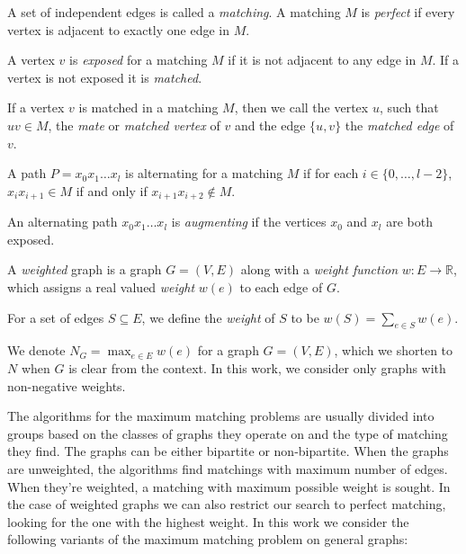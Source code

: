 \begin{defn}[matching]
    A set of independent edges is called a \emph{matching}. A matching $M$ is \emph{perfect} if every vertex is adjacent to exactly one edge in $M$.
\end{defn}

\begin{defn}
    A vertex $v$ is \emph{exposed} for a matching $M$ if it is not adjacent to any edge in $M$. If a vertex is not exposed it is \emph{matched}.
\end{defn}

If a vertex $v$ is matched in a matching $M$, then we call the vertex $u$, such that $uv \in M$, the \emph{mate} or \emph{matched vertex} of $v$ and the edge $\{u, v\}$ the \emph{matched edge} of $v$.

\begin{defn}
    A path $P = x_0x_1\dots x_l$ is alternating for a matching $M$ if for each $i \in \{0, \dots, l - 2\}$, $x_i x_{i+1} \in M$ if and only if $x_{i+1}x_{i+2} \notin M$.
\end{defn}

\begin{defn}
    An alternating path $x_0x_1\dots x_l$ is \emph{augmenting} if the vertices $x_0$ and $x_l$ are both exposed.
\end{defn}

\begin{defn}
    A \emph{weighted} graph is a graph $G = (V, E)$ along with a \emph{weight function} $w : E \rightarrow \mathbb{R}$, which assigns a real valued \emph{weight} $w(e)$ to each edge of $G$.
\end{defn}

For a set of edges $S \subseteq E$, we define the \emph{weight} of $S$ to be $w(S) = \sum_{e \in S} w(e)$. 

We denote $N_G = \max_{e \in E} w(e)$ for a graph $G = (V, E)$, which we shorten to $N$ when $G$ is clear from the context. In this work, we consider only graphs with non-negative weights.

The algorithms for the maximum matching problems are usually divided into groups based on the classes of graphs they operate on and the type of matching they find. The graphs can be either bipartite or non-bipartite. When the graphs are unweighted, the algorithms find matchings with maximum number of edges. When they're weighted, a matching with maximum possible weight is sought. In the case of weighted graphs we can also restrict our search to perfect matching, looking for the one with the highest weight. In this work we consider the following variants of the maximum matching problem on general graphs:

